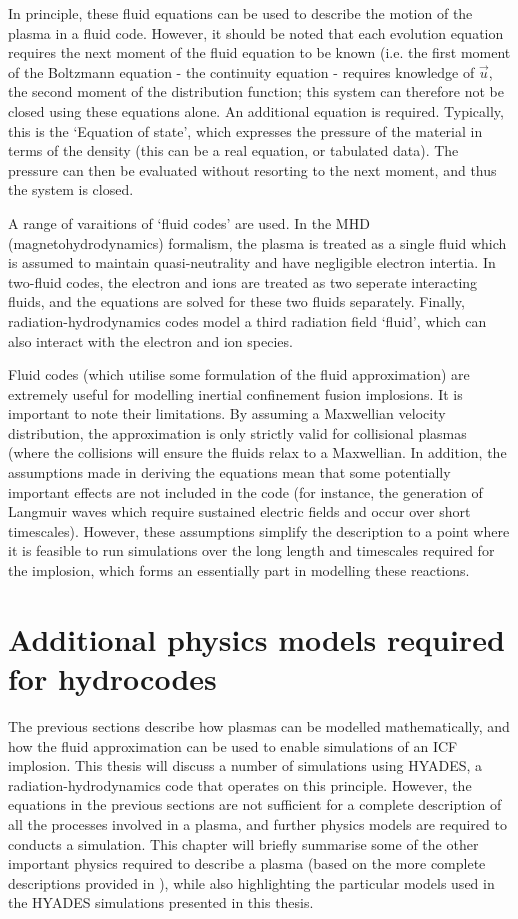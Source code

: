 In principle, these fluid equations can be used to describe the motion of the plasma in a fluid code. However, it should be noted that each evolution equation requires the next moment of the fluid equation to be known (i.e. the first moment of the Boltzmann equation - the continuity equation - requires knowledge of $\vec{u}$, the second moment of the distribution function; this system can therefore not be closed using these equations alone. An additional equation is required. Typically, this is the `Equation of state', which expresses the pressure of the material in terms of the density (this can be a real equation, or tabulated data). The pressure can then be evaluated without resorting to the next moment, and thus the system is closed.

A range of varaitions of `fluid codes' are used. In the MHD (magnetohydrodynamics) formalism, the plasma is treated as a single fluid which is assumed to maintain quasi-neutrality and have negligible electron intertia. In two-fluid codes, the electron and ions are treated as two seperate interacting fluids, and the equations are solved for these two fluids separately. Finally, radiation-hydrodynamics codes model a third radiation field `fluid', which can also interact with the electron and ion species.

Fluid codes (which utilise some formulation of the fluid approximation) are extremely useful for modelling inertial confinement fusion implosions. It is important to note their limitations. By assuming a Maxwellian velocity distribution, the approximation is only strictly valid for collisional plasmas (where the collisions will ensure the fluids relax to a Maxwellian. In addition, the assumptions made in deriving the equations mean that some potentially important effects are not included in the code (for instance, the generation of Langmuir waves which require sustained electric fields and occur over short timescales). However, these assumptions simplify the description to a point where it is feasible to run simulations over the long length and timescales required for the implosion, which forms an essentially part in modelling these reactions.

\section{Additional physics models required for hydrocodes}

The previous sections describe how plasmas can be modelled mathematically, and how the fluid approximation can be used to enable simulations of an ICF implosion. This thesis will discuss a number of simulations using HYADES, a radiation-hydrodynamics code that operates on this principle. However, the equations in the previous sections are not sufficient for a complete description of all the processes involved in a plasma, and further physics models are required to conducts a simulation. This chapter will briefly summarise some of the other important physics required to describe a plasma (based on the more complete descriptions provided in \cite{Colvin2013}), while also highlighting the particular models used in the HYADES simulations presented in this thesis.

